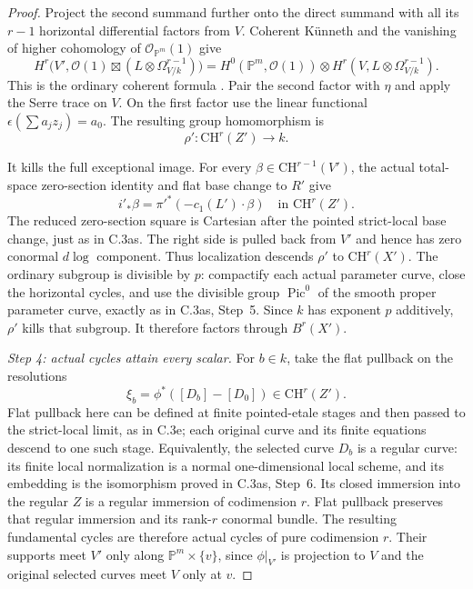 \begin{proof}
Project the second summand further onto the direct summand with
all its $r-1$ horizontal differential factors from $V$.
Coherent K\"unneth and the vanishing of higher cohomology of
$\mathcal O_{\mathbb P^m}(1)$ give
\[
 H^r\bigl(V',\mathcal O(1)\boxtimes
                          (L\otimes\Omega^{r-1}_{V/k})\bigr)
   =H^0(\mathbb P^m,\mathcal O(1))\otimes
                            H^r(V,L\otimes\Omega^{r-1}_{V/k}).
\]
This is the ordinary coherent formula
\citep[Lemma 33.29.1, Tag 0BED]{D_StacksSegreCohomology}.
Pair the second factor with $\eta$ and apply the Serre trace on $V$.
On the first factor use the linear functional
$\epsilon(\sum a_jz_j)=a_0$. The resulting group homomorphism is
\[
                          \rho':\mathrm{CH}^r(Z')\longrightarrow k.
\]

It kills the full exceptional image. For every
$\beta\in\mathrm{CH}^{r-1}(V')$, the actual total-space
zero-section identity and flat base change to $R'$ give
\[
                  i'_*\beta=\pi'^*(-c_1(L')\cdot\beta)
                                           \quad\text{in }\mathrm{CH}^r(Z').
\]
The reduced zero-section square is Cartesian after the pointed
strict-local base change, just as in C.3as. The right side is
pulled back from $V'$ and hence has zero conormal $d\log$ component.
Thus localization descends $\rho'$ to $\mathrm{CH}^r(X')$.
The ordinary subgroup is divisible by $p$: compactify each actual
parameter curve, close the horizontal cycles, and use the divisible
group $\operatorname{Pic}^0$ of the smooth proper parameter curve,
exactly as in C.3as, Step~5. Since $k$ has exponent $p$ additively,
$\rho'$ kills that subgroup. It therefore factors through $B^r(X')$.

\emph{Step 4: actual cycles attain every scalar.}
For $b\in k$, take the flat pullback on the resolutions
\[
                    \xi_b=\phi^*([D_b]-[D_0])
                                           \in\mathrm{CH}^r(Z').
\]
Flat pullback here can be defined at finite pointed-etale stages
and then passed to the strict-local limit, as in C.3e; each original
curve and its finite equations descend to one such stage.
Equivalently, the selected curve $D_b$ is a regular curve: its
finite local normalization is a normal one-dimensional local
scheme, and its embedding is the isomorphism proved in C.3as,
Step~6. Its closed immersion into the regular $Z$ is a regular
immersion of codimension $r$. Flat pullback preserves that regular
immersion and its rank-$r$ conormal bundle. The resulting fundamental
cycles are therefore actual cycles of pure codimension $r$.
Their supports
meet $V'$ only along $\mathbb P^m\times\{v\}$, since
$\phi|_{V'}$ is projection to $V$ and the original selected curves
meet $V$ only at $v$.


\end{proof}
